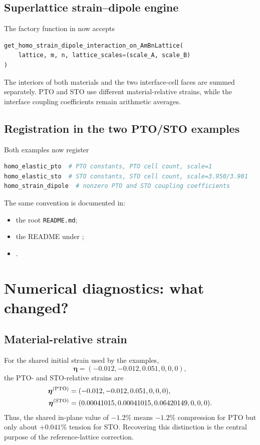 \documentclass[11pt,a4paper]{article}
\begin{document}
\subsection{Superlattice strain--dipole engine}
The factory function in  now accepts
\begin{lstlisting}[style=audit,language=Python]
get_homo_strain_dipole_interaction_on_AmBnLattice(
    lattice, m, n, lattice_scales=(scale_A, scale_B)
)
\end{lstlisting}
The interiors of both materials and the two interface-cell faces are summed separately. PTO and STO use different material-relative strains, while the interface coupling coefficients remain arithmetic averages.

\subsection{Registration in the two PTO/STO examples}
Both examples now register
\begin{lstlisting}[style=audit,language=Python]
homo_elastic_pto  # PTO constants, PTO cell count, scale=1
homo_elastic_sto  # STO constants, STO cell count, scale=3.950/3.901
homo_strain_dipole  # nonzero PTO and STO coupling coefficients
\end{lstlisting}
The same convention is documented in:
\begin{itemize}
  \item the root \texttt{README.md};
  \item the README under ;
  \item {}.
\end{itemize}

\section{Numerical diagnostics: what changed?}

\subsection{Material-relative strain}
For the shared initial strain used by the examples,
\begin{equation}
 \bm\eta=(-0.012,-0.012,0.051,0,0,0),
\end{equation}
the PTO- and STO-relative strains are
\begin{align}
 \bm\eta^{(\rm PTO)}&=(-0.012,-0.012,0.051,0,0,0),\\
 \bm\eta^{(\rm STO)}&=(0.00041015,0.00041015,0.06420149,0,0,0).
\end{align}
Thus, the shared in-plane value of $-1.2\%$ means $-1.2\%$ compression for PTO but only about $+0.041\%$ tension for STO. Recovering this distinction is the central purpose of the reference-lattice correction.
\end{document}
